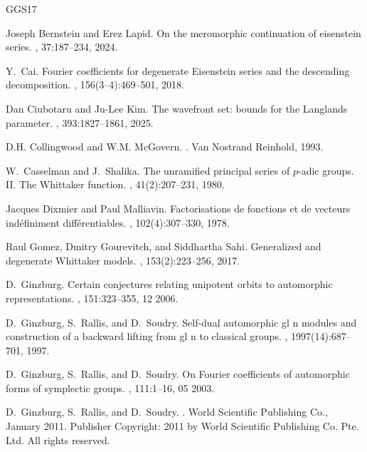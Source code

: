 \documentclass[11pt,notitlepage]{amsart}
\theoremstyle{definition}
\theoremstyle{remark}
\begin{document}
\begin{thebibliography}{GGS17}

Joseph Bernstein and Erez Lapid.
\newblock On the meromorphic continuation of eisenstein series.
, 37:187--234,
  2024.

Y.~Cai.
\newblock Fourier coefficients for degenerate {Eisenstein} series and the
  descending decomposition.
, 156(3--4):469--501, 2018.

Dan Ciubotaru and Ju-Lee Kim.
\newblock The wavefront set: bounds for the {Langlands} parameter.
, 393:1827--1861, 2025.

D.H. Collingwood and W.M. McGovern.
.
\newblock Van Nostrand Reinhold, 1993.

W.~Casselman and J.~Shalika.
\newblock The unramified principal series of $p$-adic groups. {II.} {The}
  {Whittaker} function.
, 41(2):207--231, 1980.

Jacques Dixmier and Paul Malliavin.
\newblock Factorisations de fonctions et de vecteurs indéfiniment
  différentiables.
, 102(4):307--330, 1978.

Raul Gomez, Dmitry Gourevitch, and Siddhartha Sahi.
\newblock Generalized and degenerate {Whittaker} models.
, 153(2):223--256, 2017.

D.~Ginzburg.
\newblock Certain conjectures relating unipotent orbits to automorphic
  representations.
, 151:323--355, 12 2006.

D.~Ginzburg, S.~Rallis, and D.~Soudry.
\newblock Self-dual automorphic gl n modules and construction of a backward
  lifting from gl n to classical groups.
, 1997(14):687--701,
  1997.

D.~Ginzburg, S.~Rallis, and D.~Soudry.
\newblock On {F}ourier coefficients of automorphic forms of symplectic groups.
, 111:1--16, 05 2003.

D.~Ginzburg, S.~Rallis, and D.~Soudry.
.
\newblock World Scientific Publishing Co., January 2011.
\newblock Publisher Copyright: {\textcopyright} 2011 by World Scientific
  Publishing Co. Pte. Ltd. All rights reserved.


\end{thebibliography}
\end{document}
